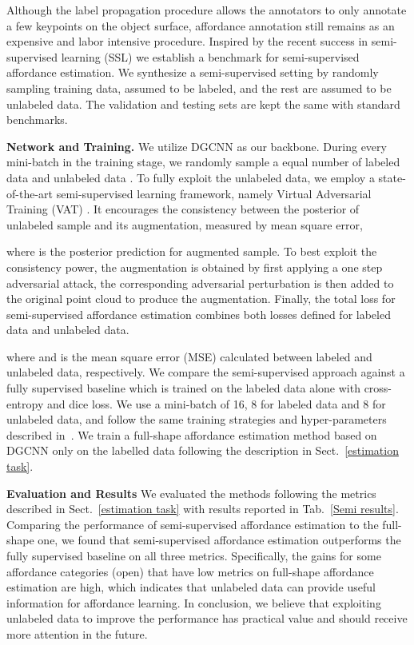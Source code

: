 \documentclass[final]{cvpr}
\begin{document}
Although the label propagation procedure allows the annotators to only annotate a few keypoints on the object surface, affordance annotation still remains as an expensive and labor intensive procedure. Inspired by the recent success in semi-supervised learning (SSL) \cite{laine2016temporal,tarvainen2017mean,miyato2018virtual} we establish a benchmark for semi-supervised affordance estimation. We synthesize a semi-supervised setting by randomly sampling  training data, assumed to be labeled, and the rest are assumed to be unlabeled data. The validation and testing sets are kept the same with standard benchmarks. 

\noindent\textbf{Network and Training.} We utilize DGCNN\cite{wang2019dynamic} as our backbone. During every mini-batch in the training stage, we randomly sample a equal number of labeled data  and unlabeled data . To fully exploit the unlabeled data, we employ a state-of-the-art semi-supervised learning framework, namely Virtual Adversarial Training (VAT) \cite{miyato2018virtual}. It encourages the consistency between the posterior of unlabeled sample and its augmentation, measured by mean square error,
\vspace{-0.3cm}

where  is the posterior prediction for augmented sample. To best exploit the consistency power, the augmentation is obtained by first applying a one step adversarial attack, the corresponding adversarial perturbation is then added to the original point cloud to produce the augmentation. Finally, the total loss for semi-supervised affordance estimation combines both losses defined for labeled data and unlabeled data.
\vspace{-0.1cm}

where  and  is the mean square error (MSE) calculated between labeled and unlabeled data, respectively. We compare the semi-supervised approach against a fully supervised baseline which is trained on the  labeled data alone with cross-entropy and dice loss.
We use a mini-batch of 16, 8 for labeled data and 8 for unlabeled data, and follow the same training strategies and hyper-parameters described in~\cite{miyato2018virtual}. We train a full-shape affordance estimation method based on DGCNN only on the labelled data following the description in Sect.~\ref{estimation task}.

\noindent\textbf{Evaluation and Results} We evaluated the methods following the metrics described in Sect.~\ref{estimation task} with results reported in Tab.~\ref{Semi results}. Comparing the performance of semi-supervised affordance estimation to the full-shape one, we found that semi-supervised affordance estimation outperforms the fully supervised baseline on all three metrics. Specifically, the gains for some affordance categories (\eg open) that have low metrics on full-shape affordance estimation are high, which indicates that unlabeled data can provide useful information for affordance learning. In conclusion, we believe that exploiting unlabeled data to improve the performance has practical value and should receive more attention in the future.
\end{document}
